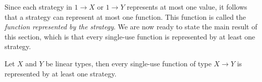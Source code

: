 Since each strategy in $1 \to X$ or $1 \to Y$ represents at most one value, it follows that a strategy can represent at most one function. This function is called the \emph{function represented by the strategy}.  We are now ready to state the main result of this section, which is that every single-use function is represented by at least one strategy.
\begin{lemma}
    Let $X$ and $Y$ be linear types, then every single-use function of type $X \to Y$ is represented by at least one strategy. 
\end{lemma}
